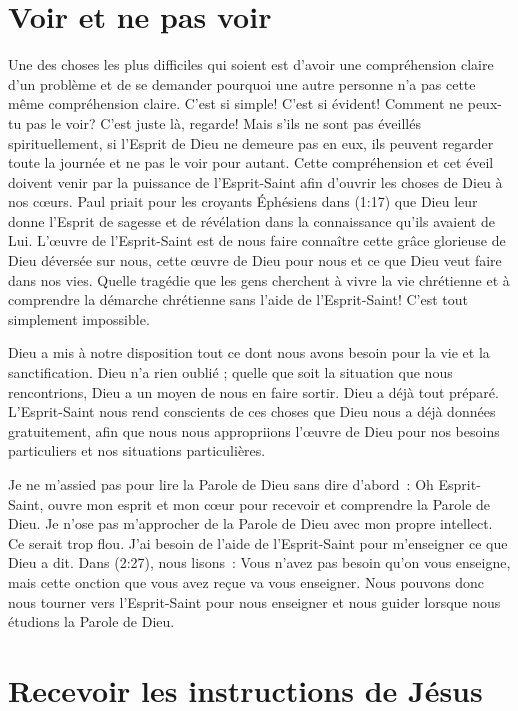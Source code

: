 \section{Voir et ne pas voir}

Une des choses les plus difficiles qui soient est d'avoir une compréhension
 claire d'un problème et de se demander pourquoi une autre personne
 n'a pas cette même compréhension claire. C'est si simple!
 C'est si évident! Comment ne peux-tu pas le voir?
 C'est juste là, regarde! Mais s'ils ne sont pas éveillés spirituellement,
 si l'Esprit de Dieu ne demeure pas en eux, ils peuvent regarder
 toute la journée et ne pas le voir pour autant.
 Cette compréhension et cet éveil doivent venir par la puissance
 de l'Esprit-Saint afin d'ouvrir les choses de Dieu à nos cœurs.
 Paul priait pour les croyants Éphésiens dans (1:17)
 que Dieu leur donne l'Esprit de sagesse et de révélation dans la
 connaissance qu'ils avaient de Lui.
 L'œuvre de l'Esprit-Saint est de nous faire
 connaître cette grâce glorieuse de Dieu déversée sur nous,
 cette œuvre de Dieu pour nous et ce que Dieu veut faire dans nos vies.
 Quelle tragédie que les gens cherchent à vivre la vie chrétienne
 et à comprendre la démarche chrétienne sans l'aide de l'Esprit-Saint!
 C'est tout simplement impossible.

Dieu a mis à notre disposition tout ce dont nous avons besoin pour la vie
 et la sanctification. Dieu n'a rien oublié ; quelle que soit la situation
 que nous rencontrions, Dieu a un moyen de nous en faire sortir.
 Dieu a déjà tout préparé. L'Esprit-Saint nous rend conscients
 de ces choses que Dieu nous a déjà données gratuitement,
 afin que nous nous appropriions l'œuvre de Dieu pour nos besoins
 particuliers et nos situations particulières.

Je ne m'assied pas pour lire la Parole de Dieu sans dire d'abord~:
 \og Oh Esprit-Saint, ouvre mon esprit et mon cœur pour recevoir
 et comprendre la Parole de Dieu. \fg{}
 Je n'ose pas m'approcher de la Parole de Dieu avec mon propre intellect.
 Ce serait trop flou. J'ai besoin de l'aide de l'Esprit-Saint
 pour m'enseigner ce que Dieu a dit.
 Dans (2:27), nous lisons~:
 \og Vous n'avez pas besoin qu'on vous enseigne, mais cette onction
 que vous avez reçue va vous enseigner. \fg{}
 Nous pouvons donc nous tourner vers l'Esprit-Saint
 pour nous enseigner et nous guider lorsque nous étudions
 la Parole de Dieu.
 \nowidow[3]


\section{Recevoir les instructions de J\'esus}

